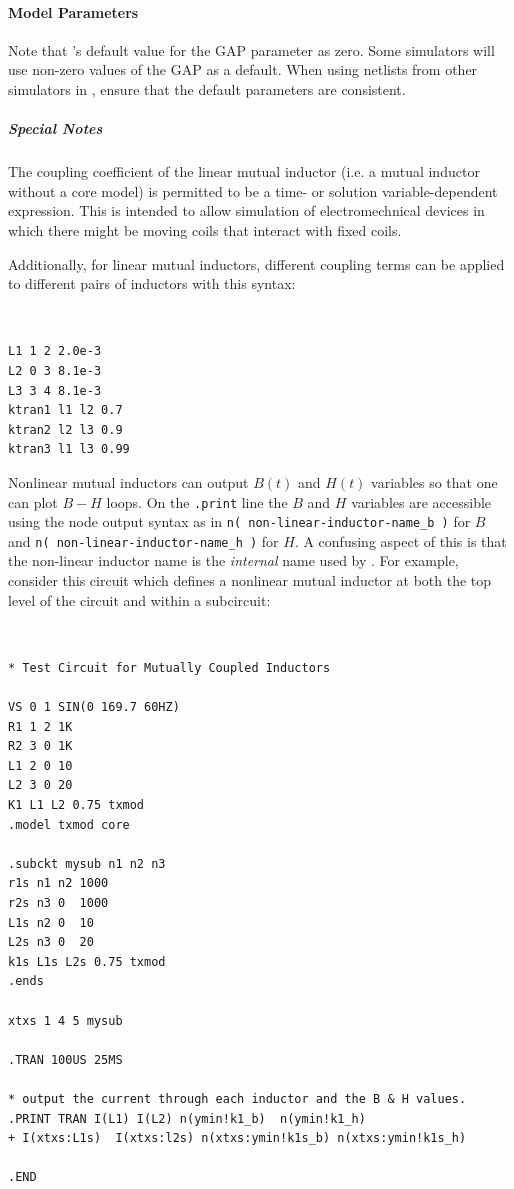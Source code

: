 \paragraph{Model Parameters}


Note that \Xyce's default value for the $\mbox{GAP}$ parameter as zero.  Some simulators
will use non-zero values of the $\mbox{GAP}$ as a default.  When using netlists from 
other simulators in \Xyce, ensure that the default parameters are consistent. 

\subparagraph{Special Notes}

The coupling coefficient of the linear mutual
inductor (i.e. a mutual inductor without a core model) is permitted to
be a time- or solution variable-dependent expression.  This is
intended to allow simulation of electromechnical devices in which
there might be moving coils that interact with fixed coils.  

Additionally, for linear mutual inductors,
different coupling terms can be applied to different pairs of inductors with this syntax:
{\tt 
\begin{verbatim}
L1 1 2 2.0e-3
L2 0 3 8.1e-3
L3 3 4 8.1e-3 
ktran1 l1 l2 0.7
ktran2 l2 l3 0.9
ktran3 l1 l3 0.99
\end{verbatim}
}

Nonlinear mutual inductors can output $B(t)$ and $H(t)$ variables so that
one can plot $B-H$ loops.  On the {\tt .print} line the $B$ and $H$ variables 
are accessible using the node output syntax as in {\tt n( non-linear-inductor-name\_b )} for $B$
and {\tt n( non-linear-inductor-name\_h )} for $H$.  A confusing aspect of this is that 
the non-linear inductor name is the {\em internal } name used by \Xyce{}.  For example, 
consider this circuit which defines a nonlinear mutual inductor at both the top level of
the circuit and within a subcircuit:

{\tt 
\begin{verbatim}
* Test Circuit for Mutually Coupled Inductors

VS 0 1 SIN(0 169.7 60HZ)
R1 1 2 1K
R2 3 0 1K
L1 2 0 10
L2 3 0 20
K1 L1 L2 0.75 txmod
.model txmod core 

.subckt mysub n1 n2 n3 
r1s n1 n2 1000
r2s n3 0  1000
L1s n2 0  10
L2s n3 0  20   
k1s L1s L2s 0.75 txmod
.ends

xtxs 1 4 5 mysub

.TRAN 100US 25MS

* output the current through each inductor and the B & H values.
.PRINT TRAN I(L1) I(L2) n(ymin!k1_b)  n(ymin!k1_h)  
+ I(xtxs:L1s)  I(xtxs:l2s) n(xtxs:ymin!k1s_b) n(xtxs:ymin!k1s_h)

.END
\end{verbatim}
}

